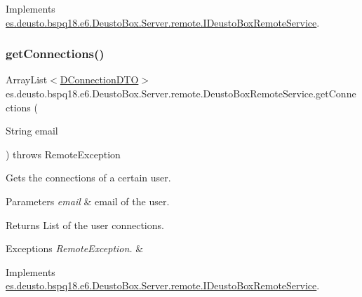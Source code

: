 Implements \mbox{\hyperlink{interfacees_1_1deusto_1_1bspq18_1_1e6_1_1_deusto_box_1_1_server_1_1remote_1_1_i_deusto_box_remote_service_a1e33451aff8fea259054145fb9534453}{es.\+deusto.\+bspq18.\+e6.\+Deusto\+Box.\+Server.\+remote.\+I\+Deusto\+Box\+Remote\+Service}}.

\mbox{\label{classes_1_1deusto_1_1bspq18_1_1e6_1_1_deusto_box_1_1_server_1_1remote_1_1_deusto_box_remote_service_adae22cc31bb23023630a6d333318363c}} 
\subsubsection{\texorpdfstring{get\+Connections()}{getConnections()}}
{\footnotesize\ttfamily Array\+List$<$\mbox{\hyperlink{classes_1_1deusto_1_1bspq18_1_1e6_1_1_deusto_box_1_1_server_1_1dto_1_1_d_connection_d_t_o}{D\+Connection\+D\+TO}}$>$ es.\+deusto.\+bspq18.\+e6.\+Deusto\+Box.\+Server.\+remote.\+Deusto\+Box\+Remote\+Service.\+get\+Connections (\begin{DoxyParamCaption}\item[{String}]{email }\end{DoxyParamCaption}) throws Remote\+Exception}

Gets the connections of a certain user. 
\begin{DoxyParams}{Parameters}
{\em email} & email of the user. \\
\hline
\end{DoxyParams}
\begin{DoxyReturn}{Returns}
List of the user connections. 
\end{DoxyReturn}

\begin{DoxyExceptions}{Exceptions}
{\em Remote\+Exception.} & \\
\hline
\end{DoxyExceptions}


Implements \mbox{\hyperlink{interfacees_1_1deusto_1_1bspq18_1_1e6_1_1_deusto_box_1_1_server_1_1remote_1_1_i_deusto_box_remote_service_a10f948f7e473ff8f56ad6d421fe8db46}{es.\+deusto.\+bspq18.\+e6.\+Deusto\+Box.\+Server.\+remote.\+I\+Deusto\+Box\+Remote\+Service}}.

